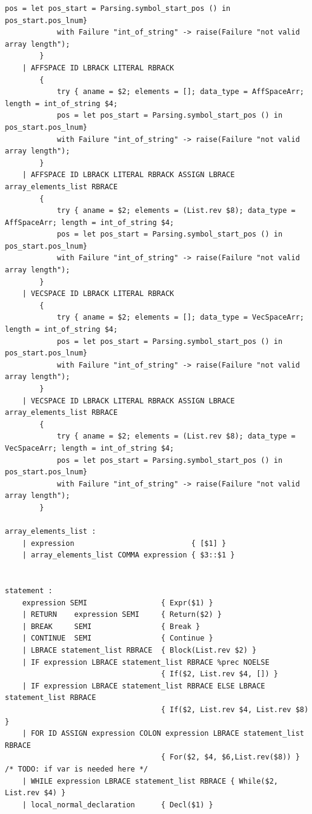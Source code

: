 \documentclass[12pt]{article} %
\begin{document}
\begin{lstlisting}[style=appendix, caption=parser.mly]
            pos = let pos_start = Parsing.symbol_start_pos () in pos_start.pos_lnum}
            with Failure "int_of_string" -> raise(Failure "not valid array length");
        }
    | AFFSPACE ID LBRACK LITERAL RBRACK 
        { 
            try { aname = $2; elements = []; data_type = AffSpaceArr; length = int_of_string $4; 
            pos = let pos_start = Parsing.symbol_start_pos () in pos_start.pos_lnum}
            with Failure "int_of_string" -> raise(Failure "not valid array length");
        }
    | AFFSPACE ID LBRACK LITERAL RBRACK ASSIGN LBRACE array_elements_list RBRACE 
        { 
            try { aname = $2; elements = (List.rev $8); data_type = AffSpaceArr; length = int_of_string $4; 
            pos = let pos_start = Parsing.symbol_start_pos () in pos_start.pos_lnum}
            with Failure "int_of_string" -> raise(Failure "not valid array length");
        }
    | VECSPACE ID LBRACK LITERAL RBRACK 
        { 
            try { aname = $2; elements = []; data_type = VecSpaceArr; length = int_of_string $4; 
            pos = let pos_start = Parsing.symbol_start_pos () in pos_start.pos_lnum}
            with Failure "int_of_string" -> raise(Failure "not valid array length");
        }
    | VECSPACE ID LBRACK LITERAL RBRACK ASSIGN LBRACE array_elements_list RBRACE 
        { 
            try { aname = $2; elements = (List.rev $8); data_type = VecSpaceArr; length = int_of_string $4; 
            pos = let pos_start = Parsing.symbol_start_pos () in pos_start.pos_lnum}
            with Failure "int_of_string" -> raise(Failure "not valid array length");
        }

array_elements_list :
    | expression                           { [$1] }
    | array_elements_list COMMA expression { $3::$1 }


statement :
    expression SEMI                 { Expr($1) }
    | RETURN    expression SEMI     { Return($2) }
    | BREAK     SEMI                { Break }
    | CONTINUE  SEMI                { Continue }
    | LBRACE statement_list RBRACE  { Block(List.rev $2) }
    | IF expression LBRACE statement_list RBRACE %prec NOELSE 
                                    { If($2, List.rev $4, []) }
    | IF expression LBRACE statement_list RBRACE ELSE LBRACE statement_list RBRACE 
                                    { If($2, List.rev $4, List.rev $8) }
    | FOR ID ASSIGN expression COLON expression LBRACE statement_list RBRACE 
                                    { For($2, $4, $6,List.rev($8)) } /* TODO: if var is needed here */
    | WHILE expression LBRACE statement_list RBRACE { While($2, List.rev $4) }
    | local_normal_declaration      { Decl($1) }


\end{lstlisting}
\end{document}
